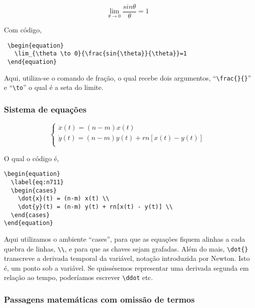 \documentclass[12pt,
brazilian,
a5paper]{abntex2} %
\begin{document}
  \begin{equation}
    \lim_{\theta \to 0}{\frac{sin{\theta}}{\theta}}=1
  \end{equation}

  Com código,

\begin{verbatim}
 \begin{equation}
   \lim_{\theta \to 0}{\frac{sin{\theta}}{\theta}}=1
 \end{equation}
\end{verbatim}

  Aqui, utiliza-se o comando de fração, o qual recebe dois
  argumentos, ``\verb+\frac{}{}+'' e ``\verb+\to+'' o qual é a seta
  do limite.

  \subsubsection{Sistema de equações}

  \begin{equation}
    \label{eq:n711}
    \begin{cases}
      \dot{x}(t) = (n-m) x(t) \\
      \dot{y}(t) = (n-m) y(t) + rn[x(t) - y(t)] \\
    \end{cases}
  \end{equation}

  O qual o código é,

\begin{verbatim}
\begin{equation}
  \label{eq:n711}
  \begin{cases}
    \dot{x}(t) = (n-m) x(t) \\
    \dot{y}(t) = (n-m) y(t) + rn[x(t) - y(t)] \\
  \end{cases}
\end{equation}
\end{verbatim}

  Aqui utilizamos o ambiente ``cases'', para que as equações fiquem
  alinhas a cada quebra de linhas, \verb+\\+, e para que as chaves sejam
  grafadas. Além do mais, \verb+\dot{}+ transcreve a derivada temporal
  da variável, notação introduzida por Newton. Isto é, um ponto sob a
  variável. Se quissésemos representar uma derivada segunda em relação
  ao tempo, poderíamos escrever \verb+\ddot+ etc.


  \subsubsection{Passagens matemáticas com omissão de termos}
\end{document}
